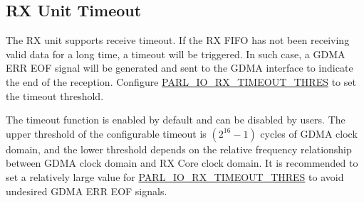 \documentclass[main\_\_EN.tex]{subfiles}
\begin{document}
\subsection{RX Unit Timeout}

The RX unit supports receive timeout. If the RX FIFO has not been receiving valid data for a long time, a timeout will be triggered. In such case, a GDMA ERR EOF signal will be generated and sent to the GDMA interface to indicate the end of the reception. Configure \hyperref[fielddesc:PARLIORXTIMEOUTTHRES]{PARL\_IO\_RX\_TIMEOUT\_THRES} to set the timeout threshold.

The timeout function is enabled by default and can be disabled by users. The upper threshold of the configurable timeout is \begin{math} (2^{16}-1) \end{math} cycles of GDMA clock domain, and the lower threshold depends on the relative frequency relationship between GDMA clock domain and RX Core clock domain. It is recommended to set a relatively large value for \hyperref[fielddesc:PARLIORXTIMEOUTTHRES]{PARL\_IO\_RX\_TIMEOUT\_THRES} to avoid undesired GDMA ERR EOF signals.
\end{document}
